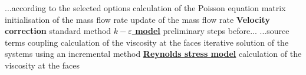\begin{table}[htp]
\hspace*{2,5cm} \hspace*{1,5cm} ...according to the selected
options\newline
\hspace*{2,5cm} \hspace*{1cm}calculation of the Poisson
equation matrix\newline
\hspace*{2,5cm} \hspace*{1cm}initialisation of the mass flow
rate\newline
\hspace*{2,5cm} \hspace*{1cm}update of the mass flow rate%
\newline
\hspace*{1,5cm} \textbf{Velocity correction}\newline
\hspace*{3,2cm} \hspace*{1cm}standard method\newline
\underline{\textbf{$k-\varepsilon$ model}}\newline
\hspace*{1cm}\newline
\hspace*{1,5cm} \hspace*{1cm}preliminary steps before...\newline
\hspace*{1,5cm} \hspace*{1,5cm}...source terms coupling\newline
\hspace*{1,5cm} \hspace*{1cm}calculation of the viscosity at
the faces\newline
\hspace*{1,5cm} \hspace*{1cm}iterative solution of the systems
using an incremental method\newline
\underline{\textbf{Reynolds stress model}}\newline
\hspace*{1cm}\newline
\hspace*{1,5cm} \hspace*{1cm}calculation of the viscosity at
the faces\newline

\end{table}
